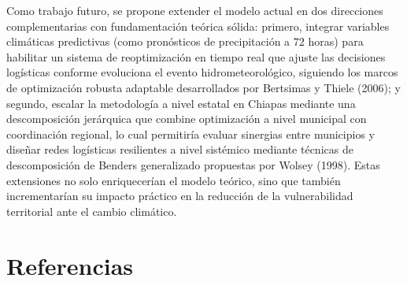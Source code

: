 \documentclass[
  spanish,
  us-letterpaper,
]{scrreprt}
\numberwithin{equation}{section}
\begin{document}
Como trabajo futuro, se propone extender el modelo actual en dos
direcciones complementarias con fundamentación teórica sólida: primero,
integrar variables climáticas predictivas (como pronósticos de
precipitación a \(72\) horas) para habilitar un sistema de
reoptimización en tiempo real que ajuste las decisiones logísticas
conforme evoluciona el evento hidrometeorológico, siguiendo los marcos
de optimización robusta adaptable desarrollados por Bertsimas y Thiele
(2006); y segundo, escalar la metodología a nivel estatal en Chiapas
mediante una descomposición jerárquica que combine optimización a nivel
municipal con coordinación regional, lo cual permitiría evaluar
sinergias entre municipios y diseñar redes logísticas resilientes a
nivel sistémico mediante técnicas de descomposición de Benders
generalizado propuestas por Wolsey (1998). Estas extensiones no solo
enriquecerían el modelo teórico, sino que también incrementarían su
impacto práctico en la reducción de la vulnerabilidad territorial ante
el cambio climático.


\chapter*{Referencias}\label{referencias}

\end{document}
